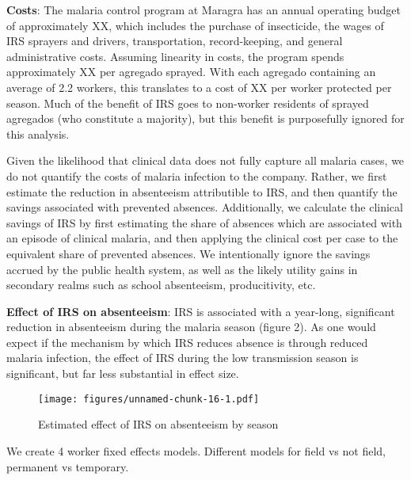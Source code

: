 \documentclass[]{article}
\begin{document}
\textbf{Costs}: The malaria control program at Maragra has an annual
operating budget of approximately XX, which includes the purchase of
insecticide, the wages of IRS sprayers and drivers, transportation,
record-keeping, and general administrative costs. Assuming linearity in
costs, the program spends approximately XX per agregado sprayed. With
each agregado containing an average of 2.2 workers, this translates to a
cost of XX per worker protected per season. Much of the benefit of IRS
goes to non-worker residents of sprayed agregados (who constitute a
majority), but this benefit is purposefully ignored for this analysis.

Given the likelihood that clinical data does not fully capture all
malaria cases, we do not quantify the costs of malaria infection to the
company. Rather, we first estimate the reduction in absenteeism
attributible to IRS, and then quantify the savings associated with
prevented absences. Additionally, we calculate the clinical savings of
IRS by first estimating the share of absences which are associated with
an episode of clinical malaria, and then applying the clinical cost per
case to the equivalent share of prevented absences. We intentionally
ignore the savings accrued by the public health system, as well as the
likely utility gains in secondary realms such as school absenteeism,
producitivity, etc.

\textbf{Effect of IRS on absenteeism}: IRS is associated with a
year-long, significant reduction in absenteeism during the malaria
season (figure 2). As one would expect if the mechanism by which IRS
reduces absence is through reduced malaria infection, the effect of IRS
during the low transmission season is significant, but far less
substantial in effect size.

\begin{figure}
\centering
\texttt{[image: figures/unnamed-chunk-16-1.pdf]}
\caption{Estimated effect of IRS on absenteeism by season}
\end{figure}

We create 4 worker fixed effects models. Different models for field vs
not field, permanent vs temporary.
\end{document}
